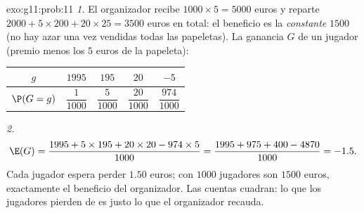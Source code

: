 \begin{solution}{exo:g11:prob:11}
\emph{1.} El organizador recibe $1000 \times 5 = 5000$ euros y reparte
$2000 + 5 \times 200 + 20 \times 25 = 3500$ euros en total: el beneficio
es la \emph{constante} $1500$ (no hay azar una vez vendidas todas las
papeletas). La ganancia $G$ de un jugador (premio menos los $5$ euros de
la papeleta):
\begin{center}
\begin{tabular}{c|cccc}
$g$ & $1995$ & $195$ & $20$ & $-5$\\
\hline\rule{0pt}{11pt}%
$\P(G=g)$ & $\dfrac{1}{1000}$ & $\dfrac{5}{1000}$ & $\dfrac{20}{1000}$
& $\dfrac{974}{1000}$
\end{tabular}
\end{center}

\emph{2.}
\[
\E(G) = \frac{1995 + 5 \times 195 + 20 \times 20 - 974 \times 5}{1000}
= \frac{1995 + 975 + 400 - 4870}{1000} = -1.5 .
\]
Cada jugador espera perder $1.50$ euros; con $1000$ jugadores son $1500$
euros, exactamente el beneficio del organizador. Las cuentas cuadran: lo
que los jugadores pierden de  es justo lo que el organizador
recauda.
\end{solution}

